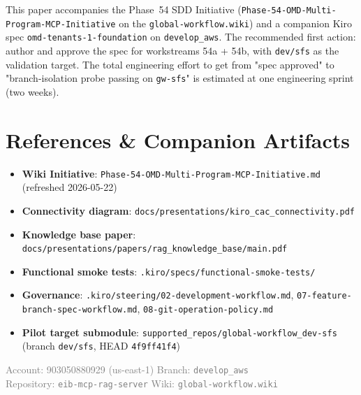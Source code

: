 \documentclass[11pt,letterpaper]{article}
\begin{document}
This paper accompanies the Phase~54 SDD Initiative
(\texttt{Phase-54-OMD-Multi-Program-MCP-Initiative} on the
\texttt{global-workflow.wiki}) and a companion Kiro spec
\texttt{omd-tenants-1-foundation} on \texttt{develop\_aws}. The
recommended first action: author and approve the spec for workstreams
54a + 54b, with \texttt{dev/sfs} as the validation target. The total
engineering effort to get from "spec approved" to "branch-isolation
probe passing on \texttt{gw-sfs}" is estimated at one engineering
sprint (two weeks).

\section{References \& Companion Artifacts}

\begin{itemize}[leftmargin=*]
    \item \textbf{Wiki Initiative}: \texttt{Phase-54-OMD-Multi-Program-MCP-Initiative.md} (refreshed 2026-05-22)
    \item \textbf{Connectivity diagram}: \texttt{docs/presentations/kiro\_cac\_connectivity.pdf}
    \item \textbf{Knowledge base paper}: \texttt{docs/presentations/papers/rag\_knowledge\_base/main.pdf}
    \item \textbf{Functional smoke tests}: \texttt{.kiro/specs/functional-smoke-tests/}
    \item \textbf{Governance}: \texttt{.kiro/steering/02-development-workflow.md}, \texttt{07-feature-branch-spec-workflow.md}, \texttt{08-git-operation-policy.md}
    \item \textbf{Pilot target submodule}: \texttt{supported\_repos/global-workflow\_dev-sfs} (branch \texttt{dev/sfs}, HEAD \texttt{4f9ff41f4})
\end{itemize}

\vfill
\begin{center}
\small\textcolor{gray}{%
    Account: 903050880929 (us-east-1) \quad Branch: \texttt{develop\_aws} \\
    Repository: \texttt{eib-mcp-rag-server} \quad Wiki: \texttt{global-workflow.wiki}
}
\end{center}
\end{document}
